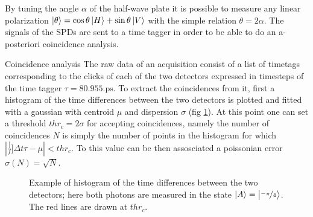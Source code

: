 \documentclass[a4paper, 11pt]{article}
\begin{document}
  By tuning the angle $\alpha$ of the half-wave plate it is possible to measure any linear polarization $\ket{\theta} = \cos{\theta}\ket{H} + \sin{\theta}\ket{V}$ with the simple relation $\theta = 2\alpha$.
  The signals of the SPDs are sent to a time tagger in order to be able to do an a-posteriori coincidence analysis.

  \par{Coincidence analysis}
  The raw data of an acquisition consist of a list of timetags corresponding to the clicks of each of the two detectors expressed in timesteps of the time tagger $\tau = 80.955\si{.\pico\second}$. To extract the coincidences from it, first a histogram of the time differences between the two detectors is plotted and fitted with a gaussian with centroid $\mu$ and dispersion $\sigma$ (fig \ref{fig:hist}). At this point one can set a threshold $thr_{c} = 2\sigma$ for accepting coincidences, namely the number of coincidences $N$ is simply the number of points in the histogram for which $|\frac[f]{\Delta t}{\tau} - \mu| < thr_{c}$. To this value can be then assosciated a poissonian error $\sigma(N) = \sqrt{N}$.

  \begin{figure}[H]
    \centering
    \caption{Example of histogram of the time differences between the two detectors; here both photons are measured in the state $\ket{A} = \ket{\frac[f]{-\pi}{4}}$. The red lines are drawn at $thr_c$.}
    \label{fig:hist}
  \end{figure}
\end{document}
